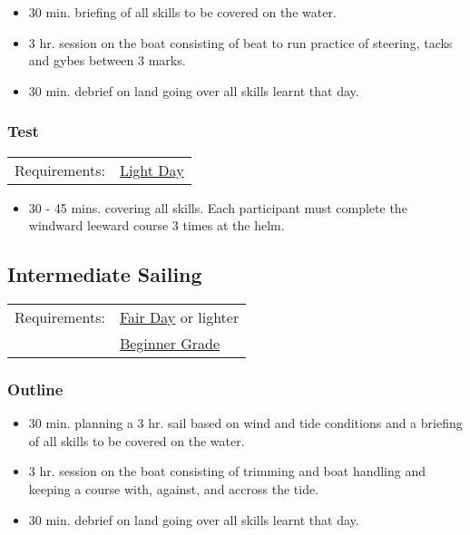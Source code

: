 \documentclass[12pt]{scrartcl}
\begin{document}
\begin{itemize}
	\item 30 min. briefing of all skills to be covered on the water.
	\item 3 hr. session on the boat consisting of beat to run practice of steering, tacks and gybes between 3 marks.
	\item 30 min. debrief on land going over all skills learnt that day.
\end{itemize}

\subsubsection{Test} \label{subsubsec:basic sailing 2:test}

\label{tab:basic sailing 2:test:requirements}
\begin{tabular}{ll}
	Requirements: & \hyperlink{condition:light day}{Light Day} \\
\end{tabular}

\begin{itemize}
	\item 30 - 45 mins. covering all skills. Each participant must complete the windward leeward course 3 times at the helm.
\end{itemize}

\newpage

\subsection{Intermediate Sailing} \label{subsec:intermediate sailing}

\label{tab:intermediate sailing:requirements}
\begin{tabular}{ll}
	Requirements: & \hyperlink{condition:fair day}{Fair Day} or lighter \\
	& \hyperlink{grade:beginner}{Beginner Grade} \\
\end{tabular}

\subsubsection{Outline} \label{subsubsec:intermediate sailing:outline}

\begin{itemize}
	\item 30 min. planning a 3 hr. sail based on wind and tide conditions and a briefing of all skills to be covered on the water.
	\item 3 hr. session on the boat consisting of trimming and boat handling and keeping a course with, against, and accross the tide.
	\item 30 min. debrief on land going over all skills learnt that day.
\end{itemize}
\end{document}
